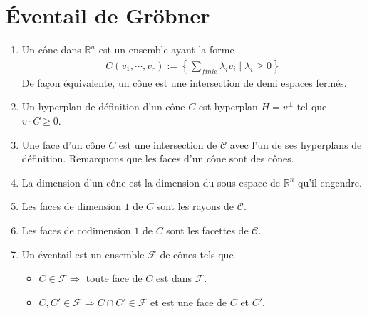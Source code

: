     \section{Éventail de Gröbner}
        \begin{defi}
            \begin{enumerate}
                \item Un cône dans $\mathbb{R}^n$ est un ensemble ayant la forme
                \begin{align*}
                    C(v_1, \cdots, v_r) := \left\{ \sum_{finie} \lambda_i v_i \mid \lambda_i \geq 0 \right\}
                \end{align*}
                De façon équivalente, un cône est une intersection de demi espaces fermés.
                \item Un hyperplan de définition d'un cône $C$ est hyperplan $H = v^\bot$ tel que $v \cdot C \geq 0$.
                \item Une face d'un cône $C$ est une intersection de $\mathcal{C}$ avec l'un de ses hyperplans de définition. Remarquons que les faces d'un cône sont des cônes.
                \item La dimension d'un cône est la dimension du sous-espace de $\mathbb{R}^n$ qu'il engendre.
                \item Les faces de dimension $1$ de $C$ sont les rayons de $\mathcal{C}$.
                \item Les faces de codimension $1$ de $C$ sont les facettes de $\mathcal{C}$.
                \item Un éventail est un ensemble $\mathcal{F}$ de cônes tels que
                \begin{itemize}
                    \item $C \in \mathcal{F} \Rightarrow$ toute face de $C$ est dans $\mathcal{F}$.
                    \item $C,C' \in \mathcal{F} \Rightarrow C \cap C' \in \mathcal{F}$ et est une face de $C$ et $C'$.
                \end{itemize}
            \end{enumerate}
        \end{defi}

